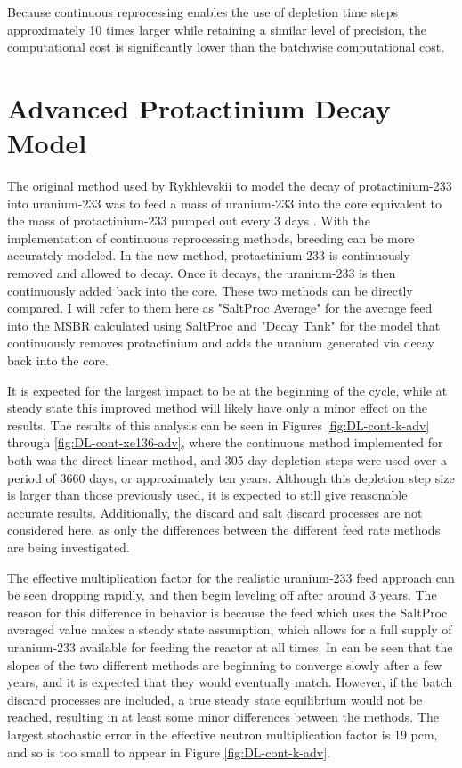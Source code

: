 Because continuous reprocessing enables the use of depletion time steps approximately 10 times larger while retaining a similar level of precision, the computational cost is significantly lower than the batchwise computational cost.

\section{Advanced Protactinium Decay Model}
\label{s:advance-decay}

The original method used by Rykhlevskii to model the decay of protactinium-233 into uranium-233 was to feed a mass of uranium-233 into the core equivalent to the mass of protactinium-233 pumped out every 3 days \cite{rykhlevskii_advanced_2018}. With the implementation of continuous reprocessing methods, breeding can be more accurately modeled. In the new method, protactinium-233 is continuously removed and allowed to decay. Once it decays, the uranium-233 is then continuously added back into the core. These two methods can be directly compared. I will refer to them here as "SaltProc Average" for the average feed into the MSBR calculated using SaltProc and "Decay Tank" for the model that continuously removes protactinium and adds the uranium generated via decay back into the core.

It is expected for the largest impact to be at the beginning of the cycle, while at steady state this improved method will likely have only a minor effect on the results. The results of this analysis can be seen in Figures \ref{fig:DL-cont-k-adv} through \ref{fig:DL-cont-xe136-adv}, where the continuous method implemented for both was the direct linear method, and 305 day depletion steps were used over a period of 3660 days, or approximately ten years. Although this depletion step size is larger than those previously used, it is expected to still give reasonable accurate results. Additionally, the discard and salt discard processes are not considered here, as only the differences between the different feed rate methods are being investigated.

The effective multiplication factor for the realistic uranium-233 feed approach can be seen dropping rapidly, and then begin leveling off after around 3 years.
The reason for this difference in behavior is because the feed which uses the SaltProc averaged value makes a steady state assumption, which allows for a full supply of uranium-233 available for feeding the reactor at all times.
In can be seen that the slopes of the two different methods are beginning to converge slowly after a few years, and it is expected that they would eventually match.
However, if the batch discard processes are included, a true steady state equilibrium would not be reached, resulting in at least some minor differences between the methods.
The largest stochastic error in the effective neutron multiplication factor is 19 pcm, and so is too small to appear in Figure \ref{fig:DL-cont-k-adv}.

